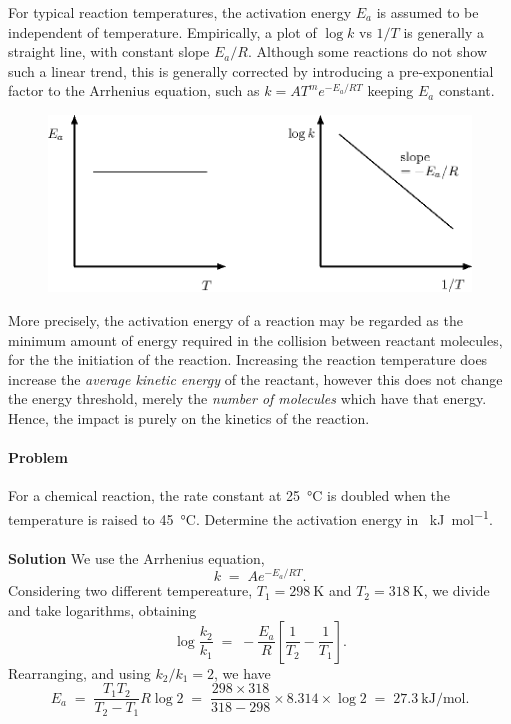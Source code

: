 \documentclass[10pt]{article}
\newcounter{prob}
\def\problem{\stepcounter{prob}\paragraph{Problem \arabic{prob}}}
\def\solution{\\\\\textbf{Solution }}
\begin{document}
        For typical reaction temperatures, the activation energy $E_a$ is assumed to be independent of temperature.
        Empirically, a plot of $\log{k}$ vs $1 / T$ is generally a straight line, with constant slope $E_a /R$.
        Although some reactions do not show such a linear trend, this is generally corrected
        by introducing a pre-exponential factor to the Arrhenius equation, such as $k = AT^m e^{-E_a /RT}$ keeping $E_a$ constant.

        \begin{figure}[h!]
        \begin{center}
                \includegraphics[scale=0.9]{./activation.eps}
        \end{center}
        \label{fig:activation}
        \end{figure}

        More precisely, the activation energy of a reaction may be regarded as the minimum amount of energy required in the collision
        between reactant molecules, for the the initiation of the reaction. Increasing the reaction temperature does increase the
        \textit{average kinetic energy} of the reactant, however this does not change the energy threshold, merely the
        \textit{number of molecules} which have that energy. Hence, the impact is purely on the kinetics of the reaction.

        \problem For a chemical reaction, the rate constant at \SI{25}{\celsius} is doubled when the temperature is raised to \SI{45}{\celsius}.
        Determine the activation energy in \SI{}{\kilo\joule\per\mole}.
        \solution We use the Arrhenius equation,
        \[
                k \;=\; Ae^{-E_a /RT}.
        \]
        Considering two different tempereature, $T_1 = \SI{298}{\kelvin}$ and $T_2 = \SI{318}{\kelvin}$, we divide and take logarithms,
        obtaining
        \[
        \log\frac{k_2}{k_1} \;=\; -\frac{E_a}{R} \left[ \frac{1}{T_2} - \frac{1}{T_1} \right].
        \]
        Rearranging, and using $k_2 /k_1 = 2$, we have
        \[
        E_a \;=\; \frac{T_1 T_2}{T_2 - T_1} R \log{2} \;=\; \frac{298\times 318}{318 - 298} \times 8.314 \times \log{2}
                \;=\; \SI{27.3}{\kilo\joule\per\mole}.
        \]
\end{document}
